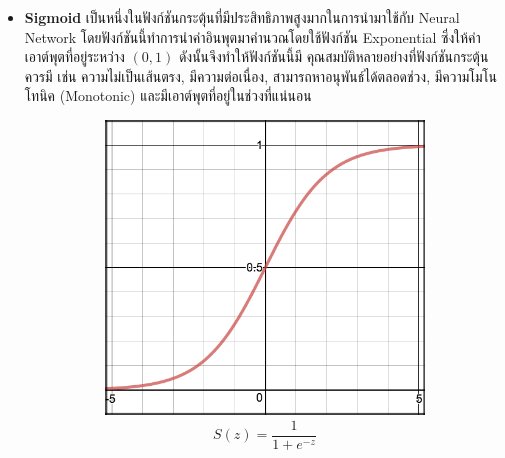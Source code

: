 \begin{itemize}
    \item \textbf{Sigmoid}\autocite{wilson1972} เป็นหนึ่งในฟังก์ชันกระตุ้นที่มีประสิทธิภาพสูงมากในการนำมาใช้กับ Neural Network 
    โดยฟังก์ชันนี้ทำการนำค่าอินพุตมาคำนวณโดยใช้ฟังก์ชัน Exponential ซึ่งให้ค่าเอาต์พุตที่อยู่ระหว่าง $(0, 1)$ ดังนั้นจึงทำให้ฟังก์ชันนี้มี%
    คุณสมบัติหลายอย่างที่ฟังก์ชันกระตุ้นควรมี เช่น ความไม่เป็นเส้นตรง, มีความต่อเนื่อง, สามารถหาอนุพันธ์ได้ตลอดช่วง, มีความโมโนโทนิค 
    (Monotonic) และมีเอาต์พุตที่อยู่ในช่วงที่แน่นอน
    \begin{figure}[H]
        \centering
        \begin{subfigure}{0.5\textwidth}
            \centering
            \includegraphics[width=0.9\linewidth]{fig/actfunc_sigmoid.png}
            \caption{%
                \begin{equation}
                    S(z) = \frac{1} {1 + e^{-z}}
                \end{equation}
            }
            \label{fig:actfunc_sigmoid}
        \end{subfigure}%
        \begin{subfigure}{0.5\textwidth}
            \centering

\end{subfigure}
\end{figure}
\end{itemize}
